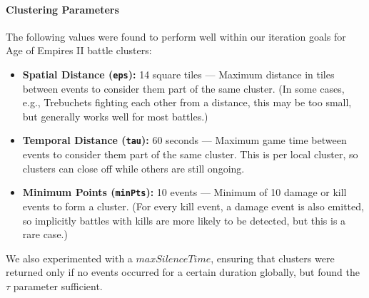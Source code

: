 \paragraph{Clustering Parameters}
The following values were found to perform well within our iteration goals for Age of Empires II battle clusters:
\begin{itemize}
  \item \textbf{Spatial Distance (\texttt{eps}):} 14 square tiles --- Maximum distance in tiles between events to consider them part of the same cluster. (In some cases, e.g., Trebuchets fighting each other from a distance, this may be too small, but generally works well for most battles.)
  \item \textbf{Temporal Distance (\texttt{tau}):} 60 seconds --- Maximum game time between events to consider them part of the same cluster. This is per local cluster, so clusters can close off while others are still ongoing.
  \item \textbf{Minimum Points (\texttt{minPts}):} 10 events --- Minimum of 10 damage or kill events to form a cluster. (For every kill event, a damage event is also emitted, so implicitly battles with kills are more likely to be detected, but this is a rare case.)
\end{itemize}

We also experimented with a $maxSilenceTime$, ensuring that clusters were returned only if no events occurred for a certain duration globally, but found the $\tau$ parameter sufficient.




